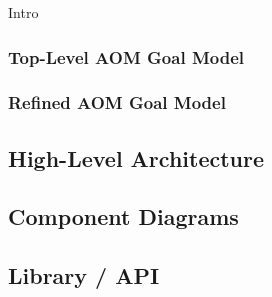 \documentclass{llncs}
\begin{document}
{			Intro
			
					
			\subsubsection{Top-Level AOM Goal Model}
				\label{sss:top-level-goal-model}
			
					
			\subsubsection{Refined AOM Goal Model}				
				\label{sss:refined-goal-model}			
	

		
		\subsection{High-Level Architecture}
			\label{ss:high-level-architecture}

		
		\subsection{Component Diagrams}
			\label{ss:component-diagrams}



		
		\subsection{Library / API}
			\label{ss:library-api}				


}
\end{document}
